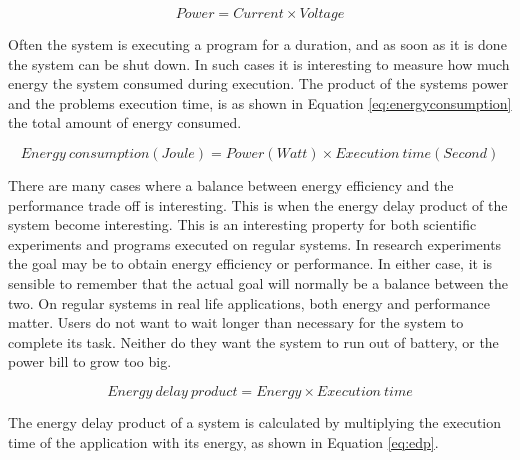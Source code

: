 \begin{equation} \label{eq:powerconsumptionbackground}
  Power = Current \times Voltage
\end{equation}

Often the system is executing a program for a duration, and as soon as it is done the system can be shut down.
In such cases it is interesting to measure how much energy the system consumed during execution.
The product of the systems power and the problems execution time, is as shown in Equation \ref{eq:energyconsumption} the total amount of energy consumed.

\begin{equation} \label{eq:energyconsumption}
  Energy\ consumption (Joule) = Power (Watt) \times Execution\ time (Second)
\end{equation}

There are many cases where a balance between energy efficiency and the performance trade off is interesting.
This is when the energy delay product of the system become interesting.
This is an interesting property for both scientific experiments and programs executed on regular systems.
In research experiments the goal may be to obtain energy efficiency or performance.
In either case, it is sensible to remember that the actual goal will normally be a balance between the two.
On regular systems in real life applications, both energy and performance matter.
Users do not want to wait longer than necessary for the system to complete its task.
Neither do they want the system to run out of battery, or the power bill to grow too big.

\begin{equation} \label{eq:edp}
  Energy\ delay\ product = Energy \times Execution\ time
\end{equation}

The energy delay product of a system is calculated by multiplying the execution time of the application with its energy, as shown in Equation \ref{eq:edp}.

